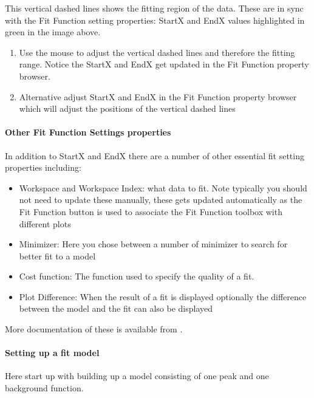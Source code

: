 \documentclass[letterpaper,10pt,english,openany]{sphinxmanual}
\begin{document}
This vertical dashed lines shows the fitting region of the data. These
are in sync with the Fit Function setting properties: StartX and EndX
values highlighted in green in the image above.
\begin{enumerate}
\def\theenumi{\arabic{enumi}}
\def\labelenumi{\theenumi .}
\makeatletter\def\p@enumii{\p@enumi \theenumi .}\makeatother
\item {} 
Use the mouse to adjust the vertical dashed lines and therefore the
fitting range. Notice the StartX and EndX get updated in the Fit
Function property browser.

\item {} 
Alternative adjust StartX and EndX in the Fit Function property
browser which will adjust the positions of the vertical dashed lines

\end{enumerate}


\paragraph{Other Fit Function Settings properties}
\label{\detokenize{mantid_basic_course/fitting_data/01_fitting_models_to_data:other-fit-function-settings-properties}}
In addition to StartX and EndX there are a number of other essential fit
setting properties including:
\begin{itemize}
\item {} 
Workspace and Workspace Index: what data to fit. Note typically you
should not need to update these manually, these gets updated
automatically as the Fit Function button is used to associate the Fit
Function toolbox with different plots

\item {} 
Minimizer: Here you chose between a number of minimizer to search for
better fit to a model

\item {} 
Cost function: The function used to specify the quality of a fit.

\item {} 
Plot Difference: When the result of a fit is displayed optionally the
difference between the model and the fit can also be displayed

\end{itemize}

More documentation of these is available from .


\paragraph{Setting up a fit model}
\label{\detokenize{mantid_basic_course/fitting_data/01_fitting_models_to_data:setting-up-a-fit-model}}
Here start up with building up a model consisting of one peak and one
background function.
\end{document}
